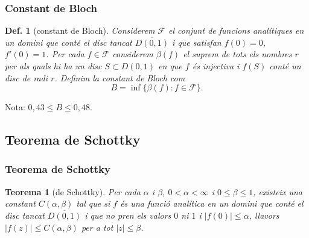 \documentclass{beamer}
\newtheorem{defi}{Def.}[section]
\newtheorem{teorema}{Teorema}[section]
\begin{document}

\begin{frame}
\frametitle{Constant de Bloch}


\begin{defi}[constant de Bloch]
Considerem $\mathcal{F}$ el conjunt de funcions analítiques en un domini que conté el disc tancat $\overline{D(0,1)}$ i que satisfan $f(0)=0$, $f'(0)=1$. Per cada $f \in \mathcal{F}$ considerem $\beta (f)$ el suprem de tots els nombres $r$ per als quals hi ha un disc $S\subset D(0,1)$ en que $f$ és injectiva i $f(S)$ conté un disc de radi $r$. Definim la constant de Bloch com 
$$B=\inf \{\beta (f): f\in \mathcal{F}\}.$$
\end{defi}

Nota: $0,43\leq B \leq 0,48$.
\end{frame}



\subsection{Teorema de Schottky}

\begin{frame}
\frametitle{Teorema de Schottky}
\begin{teorema}[de Schottky]
Per cada $\alpha$ i $\beta$, $0<\alpha<\infty$ i $0\leq\beta\leq1$, existeix una constant $C(\alpha,\beta)$ tal que si $f$ és una funció analítica en un domini que conté el disc tancat $\overline{D(0,1)}$ i que no pren els valors $0$ ni $1$ i $|f(0)|\leq\alpha$, llavors $|f(z)|\leq C(\alpha,\beta)$ per a tot $|z|\leq\beta$.


\end{teorema}

\end{frame}

\end{document}
